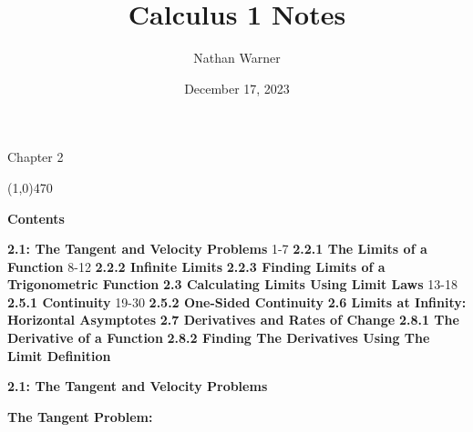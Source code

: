 \documentclass{report}
\title{\Huge{Calculus 1 Notes}}
\author{\huge{Nathan Warner}}
\date{\huge{December 17, 2023}}
\begin{document}
    \maketitle

    \begin{center}
        \Huge{Chapter 2}
    \end{center}
    \line(1,0){470} 

    \bigbreak \noindent \bigbreak \noindent  
    \begin{Huge}
        \noindent \textbf{Contents}
    \end{Huge}
    
    \bigbreak \noindent \bigbreak \noindent 
    \begin{Large}
        \textbf{2.1: The Tangent and Velocity Problems } 1-7
        \bigbreak \noindent \bigbreak \noindent  
        \textbf{2.2.1 The Limits of a Function } 8-12
        \bigbreak \noindent \bigbreak \noindent  
        \textbf{2.2.2 Infinite Limits }
        \bigbreak \noindent \bigbreak \noindent 
        \textbf{2.2.3 Finding Limits of a Trigonometric Function }
        \bigbreak \noindent \bigbreak \noindent 
        \textbf{2.3 Calculating Limits Using Limit Laws} 13-18
        \bigbreak \noindent \bigbreak \noindent 
        \textbf{2.5.1 Continuity } 19-30
        \bigbreak \noindent \bigbreak \noindent 
        \textbf{2.5.2 One-Sided Continuity}
        \bigbreak \noindent \bigbreak \noindent 
        \textbf{2.6 Limits at Infinity: Horizontal Asymptotes}
        \bigbreak \noindent \bigbreak \noindent  
        \textbf{2.7 Derivatives and Rates of Change}
        \bigbreak \noindent \bigbreak \noindent 
        \textbf{2.8.1 The Derivative of a Function}
        \bigbreak \noindent \bigbreak \noindent 
        \textbf{2.8.2 Finding The Derivatives Using The Limit Definition}
    \end{Large}

    \pagebreak
    \begin{Large}
        \noindent \textbf{2.1: The Tangent and Velocity Problems}
    \end{Large}

    \bigbreak \noindent \bigbreak \noindent \bigbreak \noindent 
    \begin{large}
       \noindent \textbf{The Tangent Problem: } 
    \end{large}
   
    \bigbreak \noindent 
   
\end{document}
